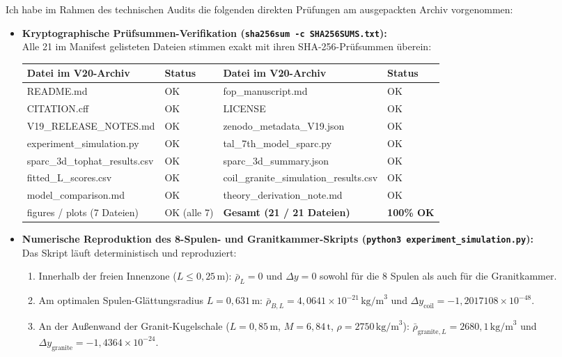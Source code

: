 \documentclass[10pt,a4paper]{article}
\begin{document}
{\footnotesize
{}\par
Ich habe im Rahmen des technischen Audits die folgenden direkten Pr\"ufungen am ausgepackten Archiv vorgenommen:

\begin{itemize}\setlength{\itemsep}{2pt}\setlength{\parskip}{1pt}\setlength{\topsep}{2pt}
  \item \textbf{Kryptographische Pr\"ufsummen-Verifikation (\texttt{sha256sum -c SHA256SUMS.txt}):}\\
  Alle 21 im Manifest gelisteten Dateien stimmen exakt mit ihren SHA-256-Pr\"ufsummen \"uberein:
  \begin{center}\vspace{-2pt}
  {\scriptsize\ttfamily
  \begin{tabular}{@{}ll@{\hspace{6mm}}ll@{}}
  \toprule
  Datei im V20-Archiv & Status & Datei im V20-Archiv & Status \\
  \midrule
  README.md & OK & fop\_manuscript.md & OK \\
  CITATION.cff & OK & LICENSE & OK \\
  V19\_RELEASE\_NOTES.md & OK & zenodo\_metadata\_V19.json & OK \\
  experiment\_simulation.py & OK & tal\_7th\_model\_sparc.py & OK \\
  sparc\_3d\_tophat\_results.csv & OK & sparc\_3d\_summary.json & OK \\
  fitted\_L\_scores.csv & OK & coil\_granite\_simulation\_results.csv & OK \\
  model\_comparison.md & OK & theory\_derivation\_note.md & OK \\
  figures / plots (7 Dateien) & OK (alle 7) & \textbf{Gesamt (21 / 21 Dateien)} & \textbf{100\% OK} \\
  \bottomrule
  \end{tabular}}
  \end{center}

  \item \textbf{Numerische Reproduktion des 8-Spulen- und Granitkammer-Skripts (\texttt{python3 experiment\_simulation.py}):}\\
  Das Skript l\"auft deterministisch und reproduziert:
  \begin{enumerate}\setlength{\itemsep}{1pt}\setlength{\parskip}{0pt}\setlength{\topsep}{1pt}
    \item Innerhalb der freien Innenzone ($L \le 0{,}25\,\text{m}$): $\bar{\rho}_L = 0$ und $\Delta y = 0$ sowohl f\"ur die 8 Spulen als auch f\"ur die Granitkammer.
    \item Am optimalen Spulen-Gl\"attungsradius $L = 0{,}631\,\text{m}$: $\bar{\rho}_{B,L} = 4{,}0641\times 10^{-21}\,\text{kg/m}^3$ und $\Delta y_{\text{coil}} = -1{,}2017108\times 10^{-48}$.
    \item An der Au\ss enwand der Granit-Kugelschale ($L = 0{,}85\,\text{m}$, $M = 6{,}84\,\text{t}$, $\rho = 2750\,\text{kg/m}^3$): $\bar{\rho}_{\text{granite},L} = 2680{,}1\,\text{kg/m}^3$ und $\Delta y_{\text{granite}} = -1{,}4364\times 10^{-24}$.
  \end{enumerate}


\end{itemize}}
\end{document}
